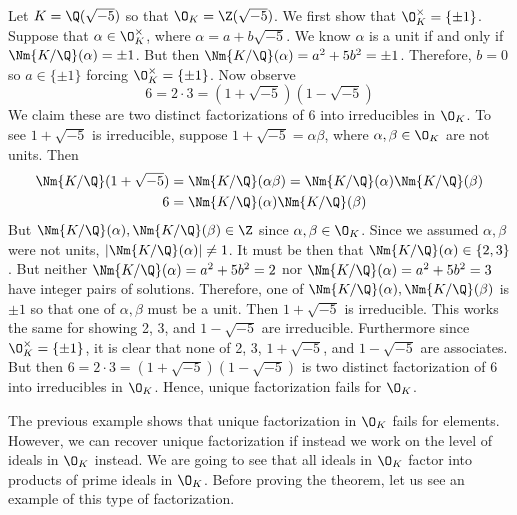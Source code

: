 \begin{ex}\label{ex:badfactorok}
Let $K=\Q(\sqrt{-5})$ so that $\O_K=\Z(\sqrt{-5})$. We first show that $\O_K^\times=\{\pm 1\}$. Suppose that $\alpha \in \O_K^\times$, where $\alpha=a+b\sqrt{-5}$. We know $\alpha$ is a unit if and only if $\Nm{K/\Q}(\alpha)= \pm 1$. But then $\Nm{K/\Q}(\alpha)=a^2+5b^2= \pm 1$. Therefore, $b=0$ so $a \in \{\pm1\}$ forcing $\O_K^\times=\{\pm 1\}$. Now observe
	\[
	6=2 \cdot 3 = (1+\sqrt{-5})(1-\sqrt{-5})
	\]
We claim these are two distinct factorizations of 6 into irreducibles in $\O_K$. To see $1+\sqrt{-5}$ is irreducible, suppose $1+\sqrt{-5}=\alpha \beta$, where $\alpha, \beta \in \O_K$ are not units. Then
	\[
	\begin{split}
	\Nm{K/\Q}(1+\sqrt{-5})&= \Nm{K/\Q}(\alpha\beta)=\Nm{K/\Q}(\alpha) \Nm{K/\Q}(\beta) \\
	6&=\Nm{K/\Q}(\alpha)\Nm{K/\Q}(\beta)
	\end{split}
	\]
But $\Nm{K/\Q}(\alpha),\Nm{K/\Q}(\beta) \in \Z$ since $\alpha,\beta \in \O_K$. Since we assumed $\alpha,\beta$ were not units, $|\Nm{K/\Q}(\alpha)| \neq 1$. It must be then that $\Nm{K/\Q}(\alpha) \in \{2,3\}$. But neither $\Nm{K/\Q}(\alpha)=a^2+5b^2=2$ nor $\Nm{K/\Q}(\alpha)=a^2+5b^2=3$ have integer pairs of solutions. Therefore, one of $\Nm{K/\Q}(\alpha),\Nm{K/\Q}(\beta)$ is $\pm 1$ so that one of $\alpha,\beta$ must be a unit. Then $1+\sqrt{-5}$ is irreducible. This works the same for showing 2, 3, and $1-\sqrt{-5}$ are irreducible. Furthermore since $\O_K^\times=\{\pm1\}$, it is clear that none of 2, 3, $1+\sqrt{-5}$, and $1-\sqrt{-5}$ are associates. But then $6=2 \cdot 3 = (1+\sqrt{-5})(1-\sqrt{-5})$ is two distinct factorization of 6 into irreducibles in $\O_K$. Hence, unique factorization fails for $\O_K$. \xqed
\end{ex}

The previous example shows that unique factorization in $\O_K$ fails for elements. However, we can recover unique factorization if instead we work on the level of ideals in $\O_K$ instead. We are going to see that all ideals in $\O_K$ factor into products of prime ideals in $\O_K$. Before proving the theorem, let us see an example of this type of factorization.


